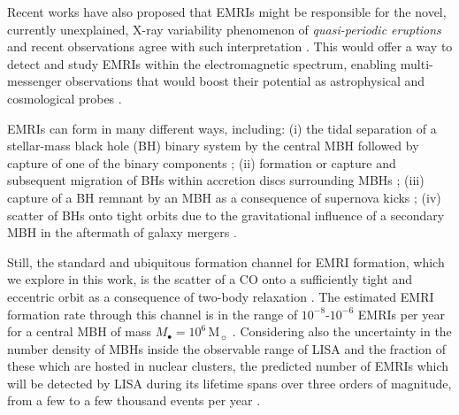 \documentclass[desactivate]{aa}
\begin{document}
   Recent works \citep[e.g.][]{2022ApJ...926..101M,2023A&A...675A.100F,2023ApJ...957...34L} have also proposed that EMRIs might be responsible for the novel, currently unexplained, X-ray variability phenomenon of \textit{quasi-periodic eruptions} \citep{2019Natur.573..381M,2020A&A...636L...2G,2021Natur.592..704A,2024A&A...684A..64A} and recent observations agree with such interpretation \citep{2024arXiv240902181N}. This would offer a way to detect and study EMRIs within the electromagnetic spectrum, enabling multi-messenger observations that would boost their potential as astrophysical and cosmological probes \citep[e.g.][]{2021PhRvL.126j1105T}.
   
   EMRIs can form in many different ways, including: (i) the tidal separation of a stellar-mass black hole (BH) binary system by the central MBH followed by capture of one of the binary components \citep{1988Natur.331..687H,2005ApJ...631L.117M}; (ii) formation or capture and subsequent migration of BHs within accretion discs surrounding MBHs \citep{2007MNRAS.374..515L,2021PhRvD.103j3018P}; (iii) capture of a BH remnant by an MBH as a consequence of supernova kicks \citep{2017MNRAS.469.1510B,2019MNRAS.485.2125B}; (iv) scatter of BHs onto tight orbits due to the gravitational influence of a secondary MBH in the aftermath of galaxy mergers \citep{2011ApJ...729...13C,2014MNRAS.438..573B,2022ApJ...927L..18N,2022MNRAS.516.1959M}.
   
   Still, the standard and ubiquitous formation channel for EMRI formation, which we explore in this work, is the scatter of a CO onto a sufficiently tight and eccentric orbit as a consequence of two-body relaxation \citep{2017ARA&A..55...17A,2018LRR....21....4A}. The estimated EMRI formation rate through this channel is in the range of $10^{-8} \text{-} 10^{-6}$ EMRIs per year for a central MBH of mass $M_\bullet = 10^6 \, \mathrm{M}_\sun$ \citep{1995ApJ...445L...7H,2004CQGra..21S1595G,2006ApJ...649L..25R}. Considering also the uncertainty in the number density of MBHs inside the observable range of LISA and the fraction of these which are hosted in nuclear clusters, the predicted number of EMRIs which will be detected by LISA during its lifetime spans over three orders of magnitude, from a few to a few thousand events per year \citep{2017PhRvD..95j3012B}.
\end{document}
